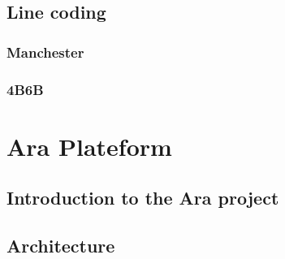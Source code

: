 \subsection{Line coding}

\subsubsection{Manchester}

\subsubsection{4B6B}



\section{Ara Plateform}
\subsection{Introduction to the Ara project}
\subsection{Architecture}